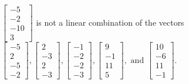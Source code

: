\begin{exercise}
\begin{exerciseStatement}
  \end{exerciseStatement}
  \begin{exerciseAnswer}
   \(\left[\begin{array}{c}
-5 \\
-2 \\
-10 \\
3
\end{array}\right]\) 
  	 is not  
	a linear combination of the vectors \(\left[\begin{array}{c}
-5 \\
2 \\
-5 \\
-2
\end{array}\right] , \left[\begin{array}{c}
2 \\
-3 \\
2 \\
-3
\end{array}\right] , \left[\begin{array}{c}
-1 \\
-2 \\
-2 \\
-3
\end{array}\right] , \left[\begin{array}{c}
9 \\
-1 \\
11 \\
5
\end{array}\right] , \text{ and } \left[\begin{array}{c}
10 \\
-6 \\
11 \\
-1
\end{array}\right]\).

	
  


  \end{exerciseAnswer}
\end{exercise}